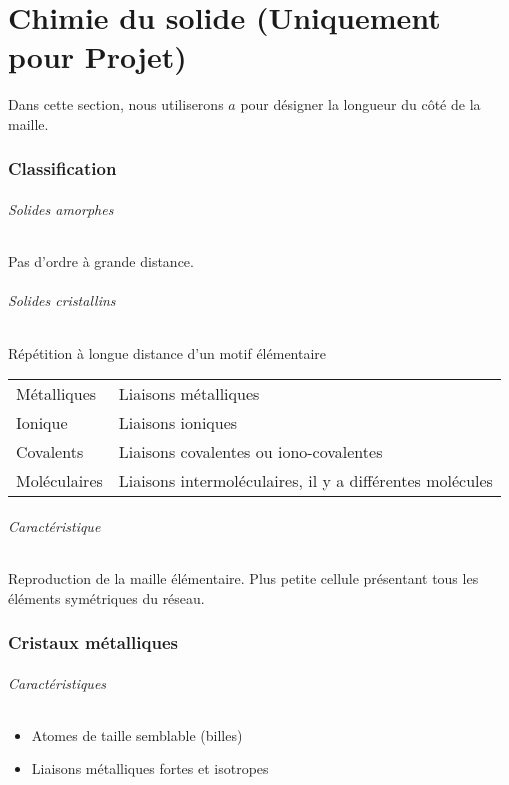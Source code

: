\part{Chimie du solide (Uniquement pour Projet)}
Dans cette section, nous utiliserons $a$ pour désigner la longueur du côté de la maille.

\section{Classification}

\paragraph{Solides amorphes}
Pas d'ordre à grande distance.

\paragraph{Solides cristallins}
Répétition à longue distance d'un motif élémentaire
\begin{center}
	\begin{tabular}{ll}
		Métalliques & Liaisons métalliques\\
		Ionique & Liaisons ioniques\\
		Covalents & Liaisons covalentes ou iono-covalentes\\
		Moléculaires & Liaisons intermoléculaires, il y a différentes molécules
	\end{tabular}
\end{center}

\paragraph{Caractéristique}
Reproduction de la maille élémentaire.
Plus petite cellule présentant tous les éléments symétriques du réseau.

\section{Cristaux métalliques}

\paragraph{Caractéristiques}
\begin{itemize}
	\item Atomes de taille semblable (billes)
	\item Liaisons métalliques fortes et isotropes
\end{itemize}

